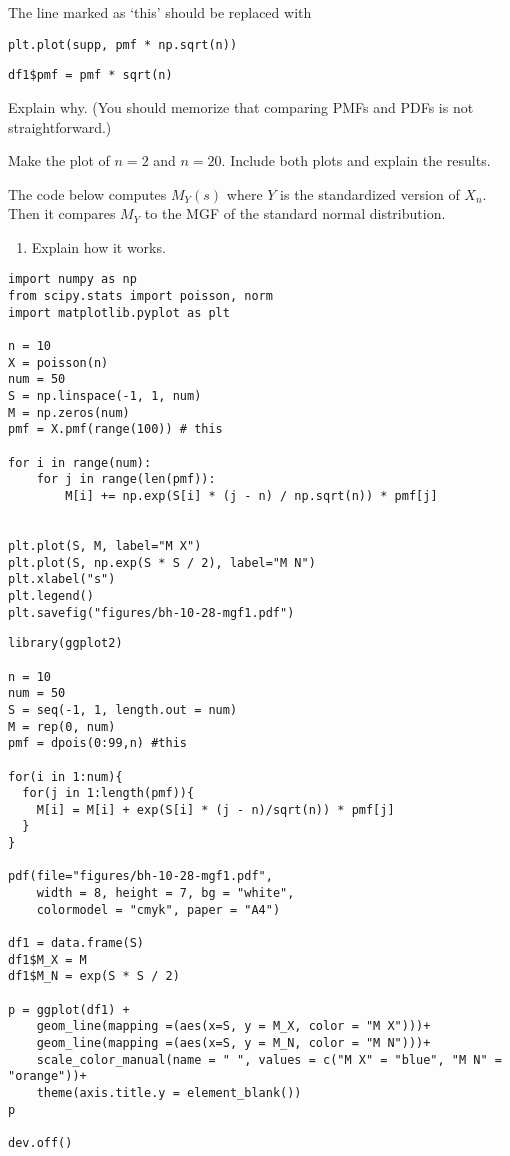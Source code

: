 \begin{exercise}
The line  marked as `this' should be replaced with
\begin{verbatim}
plt.plot(supp, pmf * np.sqrt(n))
\end{verbatim}

\begin{verbatim}
df1$pmf = pmf * sqrt(n)
\end{verbatim}
Explain why.  (You should memorize  that comparing PMFs and PDFs is not straightforward.)
\end{exercise}


\begin{exercise}
Make the plot of $n=2$ and $n=20$. Include both plots and explain the results.
\end{exercise}

\begin{exercise}
The code below computes $M_{Y}(s)$ where $Y$ is the standardized version of $X_{n}$. Then it compares $M_Y$ to the MGF of the standard normal distribution.
\begin{enumerate}
\item Explain how it works.
\end{enumerate}
\end{exercise}

\begin{verbatim}
import numpy as np
from scipy.stats import poisson, norm
import matplotlib.pyplot as plt

n = 10
X = poisson(n)
num = 50
S = np.linspace(-1, 1, num)
M = np.zeros(num)
pmf = X.pmf(range(100)) # this

for i in range(num):
    for j in range(len(pmf)):
        M[i] += np.exp(S[i] * (j - n) / np.sqrt(n)) * pmf[j]


plt.plot(S, M, label="M X")
plt.plot(S, np.exp(S * S / 2), label="M N")
plt.xlabel("s")
plt.legend()
plt.savefig("figures/bh-10-28-mgf1.pdf")
\end{verbatim}

\begin{verbatim}
library(ggplot2)

n = 10
num = 50
S = seq(-1, 1, length.out = num)
M = rep(0, num)
pmf = dpois(0:99,n) #this

for(i in 1:num){
  for(j in 1:length(pmf)){
    M[i] = M[i] + exp(S[i] * (j - n)/sqrt(n)) * pmf[j]
  }
}

pdf(file="figures/bh-10-28-mgf1.pdf",
    width = 8, height = 7, bg = "white",
    colormodel = "cmyk", paper = "A4")

df1 = data.frame(S)
df1$M_X = M
df1$M_N = exp(S * S / 2)

p = ggplot(df1) +
    geom_line(mapping =(aes(x=S, y = M_X, color = "M X")))+
    geom_line(mapping =(aes(x=S, y = M_N, color = "M N")))+
    scale_color_manual(name = " ", values = c("M X" = "blue", "M N" = "orange"))+
    theme(axis.title.y = element_blank())
p

dev.off()
\end{verbatim}

